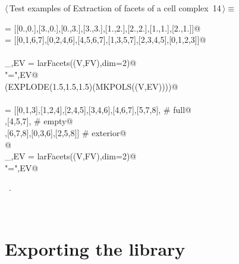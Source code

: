 \documentclass[11pt,oneside]{article}	%
\begin{document}
\begin{flushleft} \small
\begin{minipage}{\linewidth} \label{scrap27}
\protect{}$\langle\,$Test examples of Extraction of facets of a cell complex\nobreak\ {\footnotesize 14}$\,\rangle\equiv$
\vspace{-1ex}
\begin{list}{}{} \item
\mbox{}\verb@V = [[0.,0.],[3.,0.],[0.,3.],[3.,3.],[1.,2.],[2.,2.],[1.,1.],[2.,1.]]@\\
\mbox{}\verb@FV = [[0,1,6,7],[0,2,4,6],[4,5,6,7],[1,3,5,7],[2,3,4,5],[0,1,2,3]]@\\
\mbox{}\verb@@\\
\mbox{}\verb@_,EV = larFacets((V,FV),dim=2)@\\
\mbox{}\verb@print "\nEV =",EV@\\
\mbox{}\verb@VIEW(EXPLODE(1.5,1.5,1.5)(MKPOLS((V,EV))))@\\
\mbox{}\verb@@\\
\mbox{}\verb@FV = [[0,1,3],[1,2,4],[2,4,5],[3,4,6],[4,6,7],[5,7,8], # full@\\
\mbox{}\verb@   [1,3,4],[4,5,7], # empty@\\
\mbox{}\verb@   [0,1,2],[6,7,8],[0,3,6],[2,5,8]] # exterior@\\
\mbox{}\verb@      @\\
\mbox{}\verb@_,EV = larFacets((V,FV),dim=2)@\\
\mbox{}\verb@print "\nEV =",EV@\\
\mbox{}\verb@@{\NWsep}
\end{list}
\vspace{-1ex}
\footnotesize\addtolength{\baselineskip}{-1ex}
\begin{list}{}{\setlength{\itemsep}{-\parsep}\setlength{\itemindent}{-\leftmargin}}
\item \NWtxtMacroRefIn\ .
\end{list}
\end{minipage}\\[4ex]
\end{flushleft}

\section{Exporting the library}
\end{document}
